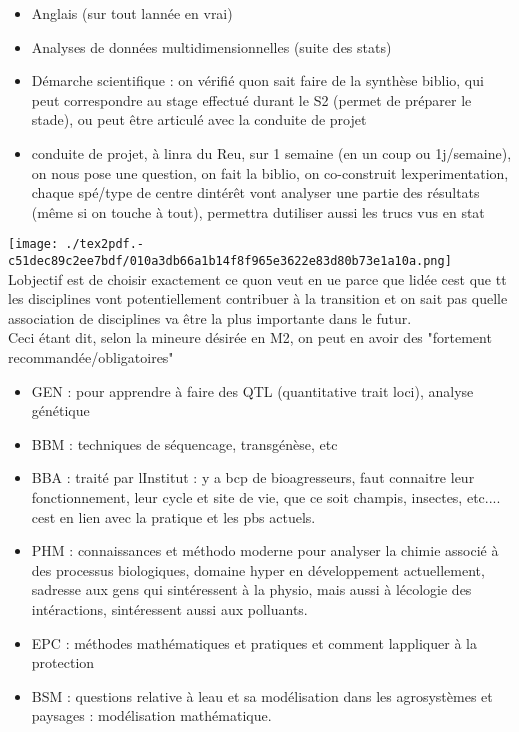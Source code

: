 \documentclass[
]{article}
\providecommand{\tightlist}{%
  \setlength{\itemsep}{0pt}\setlength{\parskip}{0pt}}
\begin{document}
\begin{itemize}
\tightlist
\item
  Anglais (sur tout l\textquotesingle année en vrai)
\item
  Analyses de données multidimensionnelles (suite des stats)
\item
  Démarche scientifique : on vérifié qu\textquotesingle on sait faire de
  la synthèse biblio, qui peut correspondre au stage effectué durant le
  S2 (permet de préparer le stade), ou peut être articulé avec la
  conduite de projet
\item
  conduite de projet, à l\textquotesingle inra du Reu, sur 1 semaine (en
  un coup ou 1j/semaine), on nous pose une question, on fait la biblio,
  on co-construit l\textquotesingle experimentation, chaque spé/type de
  centre d\textquotesingle intérêt vont analyser une partie des
  résultats (même si on touche à tout), permettra
  d\textquotesingle utiliser aussi les trucs vus en stat
\end{itemize}

\texttt{[image: ./tex2pdf.-c51dec89c2ee7bdf/010a3db66a1b14f8f965e3622e83d80b73e1a10a.png]}\\
L\textquotesingle objectif est de choisir exactement ce
qu\textquotesingle on veut en ue parce que l\textquotesingle idée
c\textquotesingle est que tt les disciplines vont potentiellement
contribuer à la transition et on sait pas quelle association de
disciplines va être la plus importante dans le futur.\\
Ceci étant dit, selon la mineure désirée en M2, on peut en avoir des
"fortement recommandée/obligatoires"

\begin{itemize}
\tightlist
\item
  GEN : pour apprendre à faire des QTL (quantitative trait loci),
  analyse génétique
\item
  BBM : techniques de séquencage, transgénèse, etc
\item
  BBA : traité par l\textquotesingle Institut : y a bcp de
  bioagresseurs, faut connaitre leur fonctionnement, leur cycle et site
  de vie, que ce soit champis, insectes, etc.... c\textquotesingle est
  en lien avec la pratique et les pbs actuels.
\item
  PHM : connaissances et méthodo moderne pour analyser la chimie associé
  à des processus biologiques, domaine hyper en développement
  actuellement, s\textquotesingle adresse aux gens qui
  s\textquotesingle intéressent à la physio, mais aussi à
  l\textquotesingle écologie des intéractions,
  s\textquotesingle intéressent aussi aux polluants.
\item
  EPC : méthodes mathématiques et pratiques et comment
  l\textquotesingle appliquer à la protection
\item
  BSM : questions relative à l\textquotesingle eau et sa modélisation
  dans les agrosystèmes et paysages : modélisation mathématique.
\end{itemize}
\end{document}
